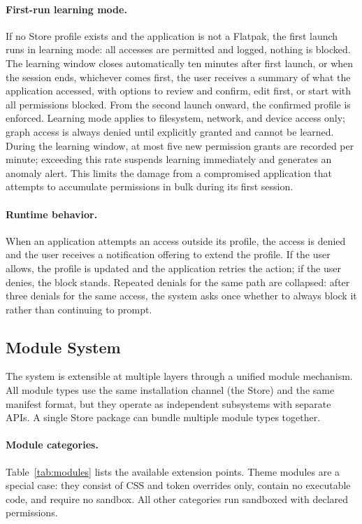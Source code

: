 \paragraph{First-run learning mode.}
If no Store profile exists and the application is not a Flatpak, the first
launch runs in learning mode: all accesses are permitted and logged, nothing is
blocked. The learning window closes automatically ten minutes after first launch, or when the session ends, whichever comes first, the user receives a summary of what the
application accessed, with options to review and confirm, edit first, or start
with all permissions blocked. From the second launch onward, the confirmed
profile is enforced. Learning mode applies to filesystem, network, and device
access only; graph access is always denied until explicitly granted and cannot
be learned. During the learning window, at most five new permission grants are recorded per minute; exceeding this rate suspends learning immediately and generates an anomaly alert. This limits the damage from a compromised application that attempts to accumulate permissions in bulk during its first session.

\paragraph{Runtime behavior.}
When an application attempts an access outside its profile, the access is
denied and the user receives a notification offering to extend the profile.
If the user allows, the profile is updated and the application retries the
action; if the user denies, the block stands. Repeated denials for the same
path are collapsed: after three denials for the same access, the system asks
once whether to always block it rather than continuing to prompt.

\subsection{Module System}
\label{sec:modules}

The system is extensible at multiple layers through a unified module mechanism.
All module types use the same installation channel (the Store) and the same
manifest format, but they operate as independent subsystems with separate APIs.
A single Store package can bundle multiple module types together.

\paragraph{Module categories.}
Table~\ref{tab:modules} lists the available extension points. Theme modules
are a special case: they consist of CSS and token overrides only, contain no
executable code, and require no sandbox. All other categories run sandboxed
with declared permissions.

